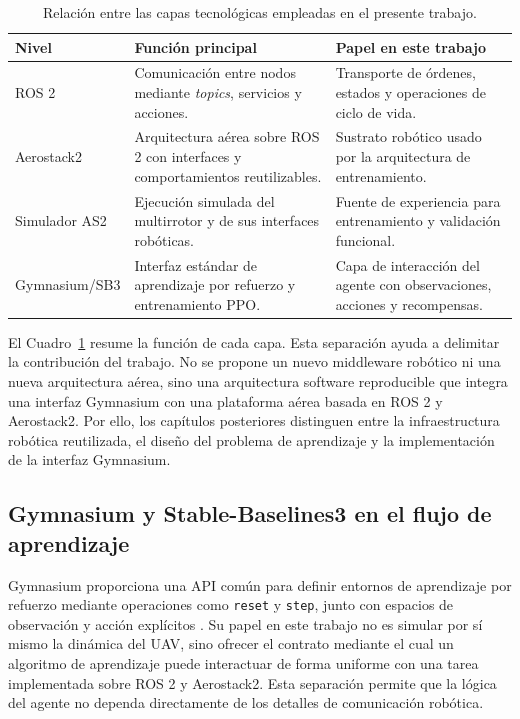 \begin{table}[H]
\centering
\small
\setlength{\tabcolsep}{4pt}
\renewcommand{\arraystretch}{1.15}
\begin{tabular}{p{} p{} p{}}
\hline
\textbf{Nivel} & \textbf{Función principal} & \textbf{Papel en este trabajo} \\
\hline
ROS 2 & Comunicación entre nodos mediante \emph{topics}, servicios y acciones. & Transporte de órdenes, estados y operaciones de ciclo de vida. \\
Aerostack2 & Arquitectura aérea sobre ROS 2 con interfaces y comportamientos reutilizables. & Sustrato robótico usado por la arquitectura de entrenamiento. \\
Simulador AS2 & Ejecución simulada del multirrotor y de sus interfaces robóticas. & Fuente de experiencia para entrenamiento y validación funcional. \\
Gymnasium/SB3 & Interfaz estándar de aprendizaje por refuerzo y entrenamiento PPO. & Capa de interacción del agente con observaciones, acciones y recompensas. \\
\hline
\end{tabular}
\caption{Relación entre las capas tecnológicas empleadas en el presente trabajo.}
\label{tab:estadoarte:capas_tecnologicas}
\end{table}

El Cuadro~\ref{tab:estadoarte:capas_tecnologicas} resume la función de cada capa.
Esta separación ayuda a delimitar la contribución del trabajo. No se propone un
nuevo middleware robótico ni una nueva arquitectura aérea, sino una arquitectura
software reproducible que integra una interfaz Gymnasium con una plataforma aérea
basada en ROS 2 y Aerostack2. Por ello, los capítulos posteriores distinguen
entre la infraestructura robótica reutilizada, el diseño del problema de
aprendizaje y la implementación de la interfaz Gymnasium.

\subsection{Gymnasium y Stable-Baselines3 en el flujo de aprendizaje}

Gymnasium proporciona una API común para definir entornos de aprendizaje por
refuerzo mediante operaciones como \texttt{reset} y \texttt{step}, junto con
espacios de observación y acción explícitos \cite{towers2024gymnasium,
gymnasium_env_api}. Su papel en este trabajo no es simular por sí mismo la
dinámica del UAV, sino ofrecer el contrato mediante el cual un algoritmo de
aprendizaje puede interactuar de forma uniforme con una tarea implementada sobre
ROS 2 y Aerostack2. Esta separación permite que la lógica del agente no dependa
directamente de los detalles de comunicación robótica.

